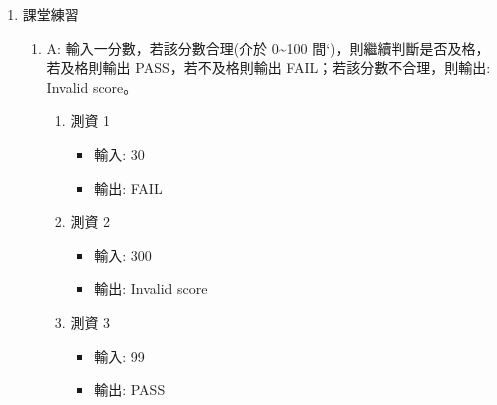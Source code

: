 \documentclass[a4paper,12pt]{article}
\begin{document}
\begin{enumerate}
\item 課堂練習
\label{sec:org9df117a}
\begin{enumerate}
\item A: 輸入一分數，若該分數合理(介於 0\textasciitilde{}100 間`)，則繼續判斷是否及格，若及格則輸出 PASS，若不及格則輸出 FAIL；若該分數不合理，則輸出: Invalid score。
\label{sec:orgf57987f}
\begin{enumerate}
\item 測資 1
\label{sec:orge744b5e}
\begin{itemize}
\item 輸入: 30\\
\item 輸出: FAIL\\
\end{itemize}
\item 測資 2
\label{sec:org84cb0ea}
\begin{itemize}
\item 輸入: 300\\
\item 輸出: Invalid score\\
\end{itemize}
\item 測資 3
\label{sec:org2ac9996}
\begin{itemize}
\item 輸入: 99\\
\item 輸出: PASS\\
\end{itemize}
\end{enumerate}
\end{enumerate}
\end{enumerate}
\end{document}
